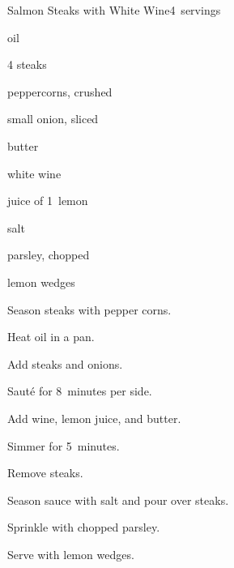 \begin{recipe}{Salmon Steaks with White Wine}{}{4~servings}

\begin{ingredients}
\item {} oil
\item 4   steaks
\item {} peppercorns, crushed
\item small onion, sliced
\item {} butter
\item {} white wine
\item juice of 1~lemon
\item salt
\item {} parsley, chopped
\item lemon wedges
\end{ingredients}

\begin{directions}
\item Season steaks with pepper corns.
\item Heat oil in a pan.
\item Add steaks and onions.
\item Sauté for 8~minutes per side.
\item Add wine, lemon juice, and butter.
\item Simmer for 5~minutes.
\item Remove steaks.
\item Season sauce with salt and pour over steaks.
\item Sprinkle with chopped parsley.
\item Serve with lemon wedges.
\end{directions}

\end{recipe}
